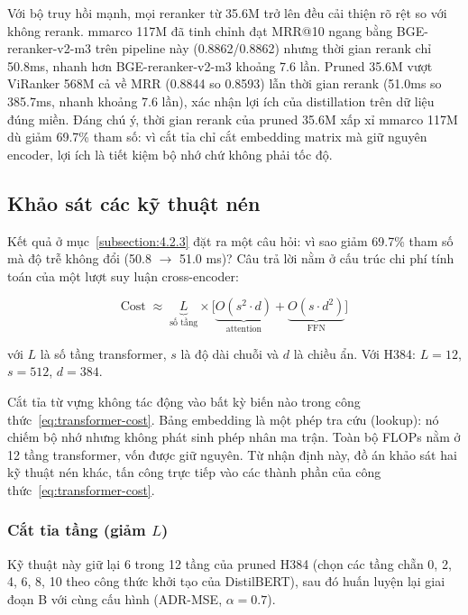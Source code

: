 \documentclass[../DoAn.tex]{subfiles}
\begin{document}
\begin{sloppypar}
Với bộ truy hồi mạnh, mọi reranker từ 35.6M trở lên đều cải thiện rõ rệt so với không rerank. mmarco 117M đã tinh chỉnh đạt MRR@10 ngang bằng BGE-\allowbreak reranker-\allowbreak v2-\allowbreak m3 trên pipeline này (0.8862/0.8862) nhưng thời gian rerank chỉ 50.8ms, nhanh hơn BGE-\allowbreak reranker-\allowbreak v2-\allowbreak m3 khoảng 7.6 lần. Pruned 35.6M vượt ViRanker 568M cả về MRR (0.8844 so 0.8593) lẫn thời gian rerank (51.0ms so 385.7ms, nhanh khoảng 7.6 lần), xác nhận lợi ích của distillation trên dữ liệu đúng miền. Đáng chú ý, thời gian rerank của pruned 35.6M xấp xỉ mmarco 117M dù giảm 69.7\% tham số: vì cắt tỉa chỉ cắt embedding matrix mà giữ nguyên encoder, lợi ích là tiết kiệm bộ nhớ chứ không phải tốc độ.
\end{sloppypar}


\subsection{Khảo sát các kỹ thuật nén}
\label{subsection:compression}

Kết quả ở mục~\ref{subsection:4.2.3} đặt ra một câu hỏi: vì sao giảm 69.7\% tham số mà độ trễ không đổi (50.8 $\to$ 51.0 ms)? Câu trả lời nằm ở cấu trúc chi phí tính toán của một lượt suy luận cross-encoder:

\begin{equation}
\label{eq:transformer-cost}
\text{Cost} \;\approx\; \underbrace{L}_{\text{số tầng}} \times \Big[ \underbrace{O(s^2 \cdot d)}_{\text{attention}} + \underbrace{O(s \cdot d^2)}_{\text{FFN}} \Big]
\end{equation}

với $L$ là số tầng transformer, $s$ là độ dài chuỗi và $d$ là chiều ẩn. Với H384: $L=12$, $s=512$, $d=384$.

Cắt tỉa từ vựng không tác động vào bất kỳ biến nào trong công thức~\eqref{eq:transformer-cost}. Bảng embedding là một phép tra cứu (lookup): nó chiếm bộ nhớ nhưng không phát sinh phép nhân ma trận. Toàn bộ FLOPs nằm ở 12 tầng transformer, vốn được giữ nguyên. Từ nhận định này, đồ án khảo sát hai kỹ thuật nén khác, tấn công trực tiếp vào các thành phần của công thức~\eqref{eq:transformer-cost}.

\subsubsection{Cắt tỉa tầng (giảm $L$)}

Kỹ thuật này giữ lại 6 trong 12 tầng của pruned H384 (chọn các tầng chẵn 0, 2, 4, 6, 8, 10 theo công thức khởi tạo của DistilBERT), sau đó huấn luyện lại giai đoạn B với cùng cấu hình (ADR-MSE, $\alpha=0.7$).
\end{document}
